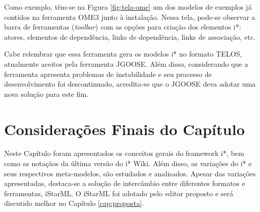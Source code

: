                 Como exemplo, têm-se na Figura \ref{fig:tela-ome} um dos modelos de exemplos já contidos na ferramenta OME3 junto à instalação.
                Nessa tela, pode-se observar a barra de ferramentas (\emph{toolbar}) com as opções para criação dos elementos i*: atores, elementos de dependência, links  de  dependência, links  de  associação, etc.

                Cabe relembrar que essa ferramenta gera os modelos i* no formato TELOS, atualmente aceitos pela ferramenta JGOOSE.
                Além disso, considerando que a ferramenta apresenta problemas de instabilidade e seu processo de desenvolvimento foi descontinuado, acredita-se que o JGOOSE deva adotar uma nova solução para este fim.

    
    \section{Considerações Finais do Capítulo}
        \label{cap:framework-sec:conclusao}
            Neste Capítulo foram apresentados
                os conceitos gerais do framework i*, bem como as notaçãos da última versão do i* Wiki.
            Além disso,
                as variações do i* e seus respectivos meta-modelos, são estudados e analisados.
            Apesar das variações apresentadas, destaca-se a solução de intercâmbio entre diferentes formatos e ferramentas, iStarML.
            O iStarML foi adotado pelo editor proposto e será discutido melhor no Capítulo \ref{cap:proposta}.

% 

